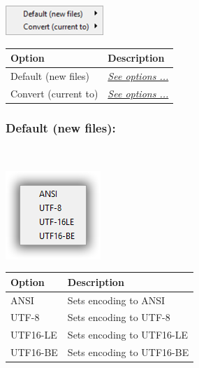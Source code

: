 \includegraphics[scale=0.50]{./res/menu_format_encoding.png}\\

\begin{scriptsize}
  \begin{tabularx}{\textwidth}{>{\hsize=0.4\hsize}X>{\hsize=0.6\hsize}X}\\
    \hline
    \textbf{Option} & \textbf{Description} \\
    \hline
    Default (new files) & \textit{\href{\#menu\_format\_encoding\_default}{See options ...}} \\
    Convert (current to) & \textit{\href{\#menu\_format\_encoding\_convert}{See options ...}} \\
    \hline
  \end{tabularx}
\end{scriptsize}


\hypertarget{menu_format_encoding_default}{}
\subsubsection{Default (new files):}\\

\includegraphics[scale=0.50]{./res/encoding.png}\\

\begin{scriptsize}
  \begin{tabularx}{\textwidth}{>{\hsize=0.3\hsize}X>{\hsize=0.7\hsize}X}\\
    \hline
    \textbf{Option} & \textbf{Description} \\
    \hline
    ANSI & Sets encoding to ANSI \\
    UTF-8 & Sets encoding to UTF-8 \\
    UTF16-LE & Sets encoding to UTF16-LE \\
    UTF16-BE & Sets encoding to UTF16-BE \\
    \hline
  \end{tabularx}
\end{scriptsize}


